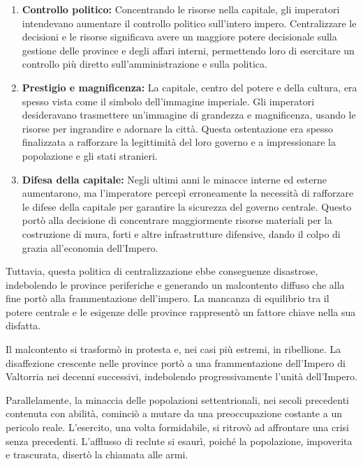 \begin{enumerate}
\def\labelenumi{\arabic{enumi}.}
\tightlist
\item
  \textbf{Controllo politico:} Concentrando le risorse nella capitale,
  gli imperatori intendevano aumentare il controllo politico sull'intero
  impero. Centralizzare le decisioni e le risorse significava avere un
  maggiore potere decisionale sulla gestione delle province e degli
  affari interni, permettendo loro di esercitare un controllo più
  diretto sull'amministrazione e sulla politica.
\item
  \textbf{Prestigio e magnificenza:} La capitale, centro del potere e
  della cultura, era spesso vista come il simbolo dell'immagine
  imperiale. Gli imperatori desideravano trasmettere un'immagine di
  grandezza e magnificenza, usando le risorse per ingrandire e adornare
  la città. Questa ostentazione era spesso finalizzata a rafforzare la
  legittimità del loro governo e a impressionare la popolazione e gli
  stati stranieri.
\item
  \textbf{Difesa della capitale:} Negli ultimi anni le minacce interne
  ed esterne aumentarono, ma l'imperatore percepì erroneamente la
  necessità di rafforzare le difese della capitale per garantire la
  sicurezza del governo centrale. Questo portò alla decisione di
  concentrare maggiormente risorse materiali per la costruzione di mura,
  forti e altre infrastrutture difensive, dando il colpo di grazia
  all'economia dell'Impero.
\end{enumerate}

Tuttavia, questa politica di centralizzazione ebbe conseguenze
disastrose, indebolendo le province periferiche e generando un
malcontento diffuso che alla fine portò alla frammentazione dell'impero.
La mancanza di equilibrio tra il potere centrale e le esigenze delle
province rappresentò un fattore chiave nella sua disfatta.

Il malcontento si trasformò in protesta e, nei casi più estremi, in
ribellione. La disaffezione crescente nelle province portò a una
frammentazione dell'Impero di Valtorria nei decenni successivi,
indebolendo progressivamente l'unità dell'Impero.

Parallelamente, la minaccia delle popolazioni settentrionali, nei secoli
precedenti contenuta con abilità, cominciò a mutare da una
preoccupazione costante a un pericolo reale. L'esercito, una volta
formidabile, si ritrovò ad affrontare una crisi senza precedenti.
L'afflusso di reclute si esaurì, poiché la popolazione, impoverita e
trascurata, disertò la chiamata alle armi.

